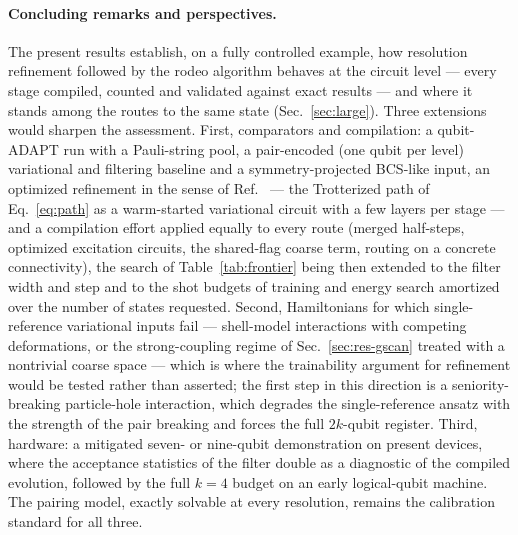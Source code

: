\documentclass[
  aps,            %
  prc,            %
  reprint,        %
  superscriptaddress,
  floatfix,
  nofootinbib
]{revtex4-2}
\begin{document}
\paragraph{Concluding remarks and perspectives.}
The present results establish, on a fully controlled example, how resolution
refinement followed by the rodeo algorithm behaves at the circuit level ---
every stage compiled, counted and validated against exact results --- and
where it stands among the routes to the same state (Sec.~\ref{sec:large}).
Three extensions would sharpen the assessment.
First, comparators and compilation: a qubit-ADAPT run with a Pauli-string
pool, a pair-encoded (one qubit per level) variational and filtering
baseline and a symmetry-projected BCS-like input, an optimized refinement in the sense of
Ref.~\cite{Sadia2026} --- the Trotterized path of Eq.~\eqref{eq:path} as a
warm-started variational circuit with a few layers per stage --- and a
compilation effort applied equally to every route (merged half-steps,
optimized excitation circuits, the shared-flag coarse term, routing on a
concrete connectivity), the search of Table~\ref{tab:frontier} being then
extended to the filter width and step and to the shot budgets of training
and energy search amortized over the number of states requested.  Second, Hamiltonians for which single-reference
variational inputs fail --- shell-model interactions with competing
deformations, or the strong-coupling regime of Sec.~\ref{sec:res-gscan}
treated with a nontrivial coarse space --- which is where the trainability
argument for refinement would be tested rather than asserted; the first
step in this direction is a seniority-breaking particle-hole interaction,
which degrades the single-reference ansatz with the strength of the pair
breaking and forces the full $2k$-qubit register.  Third,
hardware: a mitigated seven- or nine-qubit demonstration on present devices,
where the acceptance statistics of the filter double as a diagnostic of the
compiled evolution, followed by the full $k=4$ budget on an early
logical-qubit machine.  The pairing model, exactly solvable at every
resolution, remains the calibration standard for all three.

\end{document}
